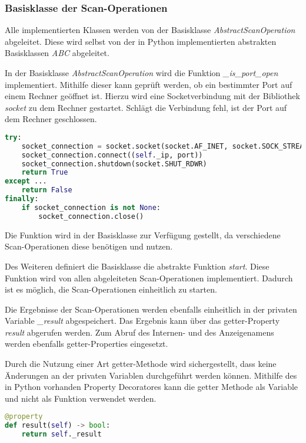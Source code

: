 \subsubsection{Basisklasse der Scan-Operationen}

Alle implementierten Klassen werden von der Basisklasse \textit{AbstractScanOperation} abgeleitet. Diese wird selbst von der in Python implementierten abstrakten Basisklassen \textit{ABC} abgeleitet.

In der Basisklasse \textit{AbstractScanOperation} wird die Funktion \textit{\_is\_port\_open} implementiert. Mithilfe dieser kann geprüft werden, ob ein bestimmter Port auf einem Rechner geöffnet ist. Hierzu wird eine Socketverbindung mit der Bibliothek \textit{socket} zu dem Rechner gestartet. Schlägt die Verbindung fehl, ist der Port auf dem Rechner geschlossen.

\begin{lstlisting}[language=Python, frame=single, caption={Big Brother Funktion is\_port\_open}, captionpos=b, label={lst:bigbrother-port-open}]
try:
	socket_connection = socket.socket(socket.AF_INET, socket.SOCK_STREAM)
	socket_connection.connect((self._ip, port))
	socket_connection.shutdown(socket.SHUT_RDWR)
	return True
except ...
	return False
finally:
	if socket_connection is not None:
		socket_connection.close()
\end{lstlisting}

Die Funktion wird in der Basisklasse zur Verfügung gestellt, da verschiedene Scan-Operationen diese benötigen und nutzen.

Des Weiteren definiert die Basisklasse die abstrakte Funktion \textit{start}. Diese Funktion wird von allen abgeleiteten Scan-Operationen implementiert. Dadurch ist es möglich, die Scan-Operationen einheitlich zu starten.

Die Ergebnisse der Scan-Operationen werden ebenfalls einheitlich in der privaten Variable \textit{\_result} abgespeichert. Das Ergebnis kann über das getter-Property \textit{result} abgerufen werden. Zum Abruf des Internen- und des Anzeigenamens werden ebenfalls getter-Properties eingesetzt. 

Durch die Nutzung einer Art getter-Methode wird sichergestellt, dass keine Änderungen an der privaten Variablen durchgeführt werden können. Mithilfe des in Python vorhanden Property Decoratores kann die getter Methode als Variable und nicht als Funktion verwendet werden.

\begin{lstlisting}[language=Python, frame=single, caption={Big Brother Ergebniss getter-Property}, captionpos=b, label={lst:bigbrother-getter-result}]
@property
def result(self) -> bool:
	return self._result
\end{lstlisting}

